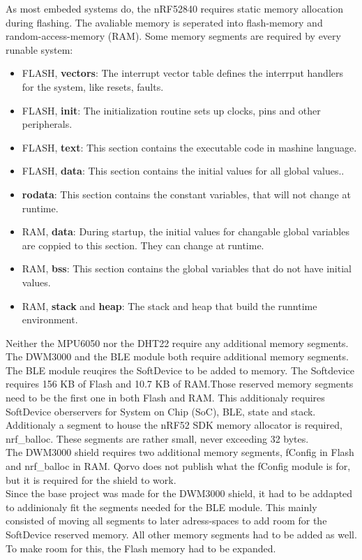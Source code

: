 As most embeded systems do, the nRF52840 requires static memory allocation during flashing.
The avaliable memory is seperated into flash-memory and random-access-memory (RAM).
Some memory segments are required by every runable system:
\begin{itemize}
	\item FLASH, \textbf{vectors}: The interrupt vector table defines the interrput handlers for the system, like resets, faults.
	\item FLASH, \textbf{init}: The initialization routine sets up clocks, pins and other peripherals.
	\item FLASH, \textbf{text}: This section contains the executable code in mashine language.
	\item FLASH, \textbf{data}: This section contains the initial values for all global values..
	\item \textbf{rodata}: This section contains the constant variables, that will not change at runtime.
	\item RAM, \textbf{data}: During startup, the initial values for changable global variables are coppied to this section. They can change at runtime.
	\item RAM, \textbf{bss}: This section contains the global variables that do not have initial values.
	\item RAM, \textbf{stack} and \textbf{heap}: The stack and heap that build the runntime environment.
\end{itemize}
Neither the MPU6050 nor the DHT22 require any additional memory segments.
The DWM3000 and the BLE module both require additional memory segments. \\
The BLE module reuqires the SoftDevice to be added to memory. The Softdevice requires 156 KB of Flash and 10.7 KB of RAM.Those reserved memory segments need to be the first one in both Flash and RAM. This additionaly requires SoftDevice oberservers for System on Chip (SoC), BLE, state and stack. Additionaly a segment to house the nRF52 SDK memory allocator is required, nrf{\_}balloc. These segments are rather small, never exceeding 32 bytes.\\
The DWM3000 shield requires two additional memory segments, fConfig in Flash and nrf{\_}balloc in RAM. 
Qorvo does not publish what the fConfig module is for, but it is required for the shield to work. \\
Since the base project was made for the DWM3000 shield, it had to be addapted to addinionaly fit the segments needed for the BLE module. This mainly consisted of moving all segments to later adress-spaces to add room for the SoftDevice reserved memory. All other memory segments had to be added as well. To make room for this, the Flash memory had to be expanded. \\
